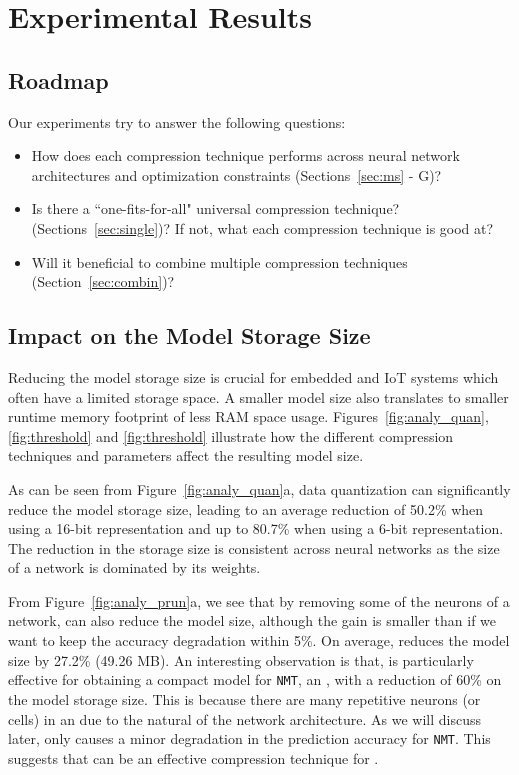 \section{Experimental Results}


\subsection{Roadmap}
Our experiments try to answer the following questions:

\begin{itemize}
\item How does each compression technique performs across neural network architectures and optimization constraints
    (Sections~\ref{sec:ms} - G)?
\item Is there a ``one-fits-for-all" universal compression technique? (Sections~\ref{sec:single})? If not, what each compression
    technique is good at?
\item Will it beneficial to combine multiple compression techniques (Section~\ref{sec:combin})?
\end{itemize}

\subsection{Impact on the Model Storage Size\label{sec:ms}}
Reducing the model storage size is crucial for embedded and IoT systems which often have a limited storage space. A smaller model size also
translates to smaller runtime memory footprint of less RAM space usage. Figures~\ref{fig:analy_quan},\ref{fig:threshold} and \ref{fig:threshold} illustrate
how the different compression techniques and parameters affect the resulting model size.

As can be seen from Figure~\ref{fig:analy_quan}a, data quantization can significantly reduce the model storage size, leading to an average
reduction of 50.2\% when using a 16-bit representation and up to 80.7\% when using a 6-bit representation. The reduction in the storage
size is consistent across neural networks as the size of a network is dominated by its weights.

From Figure~\ref{fig:analy_prun}a, we see that by removing some of the neurons of a network, \pruning can also reduce the model size,
although the gain is smaller than \quantization if we want to keep the accuracy degradation within 5\%. On average, \pruning reduces the
model size by 27.2\% (49.26 MB). An interesting observation is that, \pruning is particularly effective for obtaining a compact model for
\texttt{NMT}, an \RNN, with a reduction of 60\% on the model storage size. This is because there are many repetitive neurons (or cells) in
an \RNN due to the natural of the network architecture. As we will discuss later, \pruning only causes a minor degradation in the
prediction accuracy for \texttt{NMT}. This suggests that \pruning can be an effective compression technique for \RNNs.

